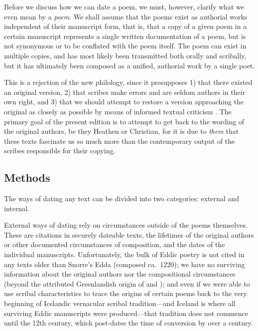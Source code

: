 Before we discuss how we can date a poem, we must, however, clarify what we even mean by a \emph{poem}.  We shall assume that the poems exist as authorial works independent of their manuscript form, that is, that a copy of a given poem in a certain manuscript represents a single written documentation of a poem, but is not synonymous or to be conflated with the poem itself.  The poem can exist in multiple copies, and has most likely been transmitted both orally and scribally, but it has ultimately been composed as a unified, authorial work by a single poet.

This is a rejection of the new philology, since it presupposes 1) that there existed an original version, 2) that scribes make errors and are seldom authors in their own right, and 3) that we should attempt to restore a version approaching the original as closely as possible by means of informed textual criticism \parencites{Males2023Textual}{Males2024Emend}{Haukur2020}.  The primary goal of the present edition is to attempt to get back to the wording of the original authors, be they Heathen or Christian, for it is due to \emph{them} that these texts fascinate us so much more than the contemporary output of the scribes responsible for their copying.

\subsection{Methods}

The ways of dating any text can be divided into two categories: external and internal.

External ways of dating rely on circumstances outside of the poems themselves.  These are citations in securely dateable texts, the lifetimes of the original authors or other documented circumstances of composition, and the dates of the individual manuscripts.  Unfortunately, the bulk of Eddic poetry is not cited in any texts older than Snorre’s Edda (composed ca.~1220); we have no surviving information about the original authors nor the compositional circumstances (beyond the attributed Greenlandish origin of  and ); and even if we were able to use scribal characteristics to trace the origins of certain poems back to the very beginning of Icelandic vernacular scribal tradition---and Iceland is where all surviving Eddic manuscripts were produced---that tradition does not commence until the 12th century, which post-dates the time of conversion by over a century.

